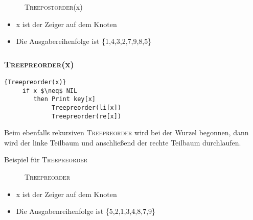   \begin{figure}[H]
  \centering  
   \caption{\textsc{Treepostorder}(x)}
   \label{171103b}
  \end{figure}
  \begin{itemize}
   \item x ist der Zeiger auf dem Knoten
   \item Die Ausgabereihenfolge ist \{1,4,3,2,7,9,8,5\}
  \end{itemize}
 
 \subsubsection{\textsc{Treepreorder}(x)}
   \begin{Algorithmus}[H]   
    \begin{lstlisting}[frame=tlrb, mathescape=true, title=\textsc{Treepreorder\textnormal{(x)}}, gobble=4]{Treepreorder(x)}
     if x $\neq$ NIL
        then Print key[x]
             Treepreorder(li[x])
             Treepreorder(re[x])
    \end{lstlisting}

   Beim ebenfalls rekursiven \textsc{Treepreorder} wird bei der Wurzel begonnen, dann wird der 
   linke Teilbaum und anschließend der rechte Teilbaum durchlaufen.
   \end{Algorithmus}
Beispiel für \textsc{Treepreorder}
   
  \begin{figure}[H]
  \centering  
   \caption{\textsc{Treepreorder }}
   \label{171103c}
  \end{figure}
 \begin{itemize}
  \item x ist der Zeiger auf dem Knoten
  \item Die Ausgabenreihenfolge ist \{5,2,1,3,4,8,7,9\}
 \end{itemize}
 
